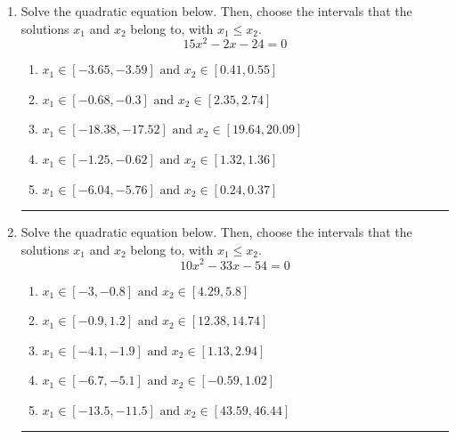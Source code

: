 \documentclass[14pt]{extbook}
\newcommand{\litem}[1]{\item#1\hspace*{-1cm}\rule{\textwidth}{0.4pt}}
\begin{document}
\begin{enumerate}
{\begin{enumerate}[label=\Alph*.]
\end{enumerate} }
\litem{
Solve the quadratic equation below. Then, choose the intervals that the solutions $x_1$ and $x_2$ belong to, with $x_1 \leq x_2$.\[ 15x^{2} -2 x -24 = 0 \]\begin{enumerate}[label=\Alph*.]
\item \( x_1 \in [-3.65, -3.59] \text{ and } x_2 \in [0.41, 0.55] \)
\item \( x_1 \in [-0.68, -0.3] \text{ and } x_2 \in [2.35, 2.74] \)
\item \( x_1 \in [-18.38, -17.52] \text{ and } x_2 \in [19.64, 20.09] \)
\item \( x_1 \in [-1.25, -0.62] \text{ and } x_2 \in [1.32, 1.36] \)
\item \( x_1 \in [-6.04, -5.76] \text{ and } x_2 \in [0.24, 0.37] \)

\end{enumerate} }
\litem{
Solve the quadratic equation below. Then, choose the intervals that the solutions $x_1$ and $x_2$ belong to, with $x_1 \leq x_2$.\[ 10x^{2} -33 x -54 = 0 \]\begin{enumerate}[label=\Alph*.]
\item \( x_1 \in [-3, -0.8] \text{ and } x_2 \in [4.29, 5.8] \)
\item \( x_1 \in [-0.9, 1.2] \text{ and } x_2 \in [12.38, 14.74] \)
\item \( x_1 \in [-4.1, -1.9] \text{ and } x_2 \in [1.13, 2.94] \)
\item \( x_1 \in [-6.7, -5.1] \text{ and } x_2 \in [-0.59, 1.02] \)
\item \( x_1 \in [-13.5, -11.5] \text{ and } x_2 \in [43.59, 46.44] \)


\end{enumerate}}
\end{enumerate}
\end{document}
